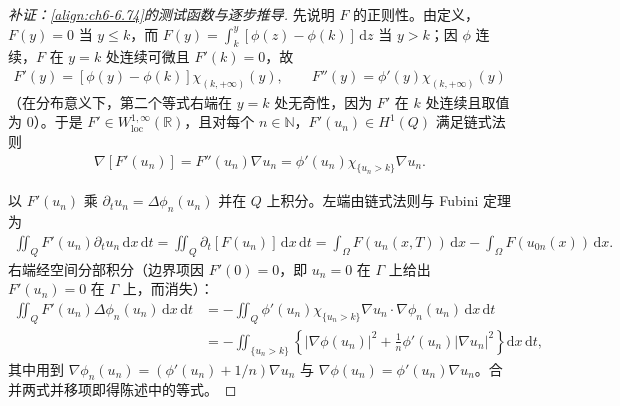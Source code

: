 \documentclass[../../main.tex]{subfiles}%
\begin{document}
\begin{proof}[补证：\eqref{align:ch6-6.74}的测试函数与逐步推导]
先说明 $F$ 的正则性。由定义，$F(y)=0$ 当 $y\leqslant k$，而 $F(y)=\int_k^y[\phi(z)-\phi(k)]\,\mathrm{d}z$ 当 $y>k$；因 $\phi$ 连续，$F$ 在 $y=k$ 处连续可微且 $F'(k)=0$，故
\begin{align*}
F'(y)=[\phi(y)-\phi(k)]\chi_{(k,+\infty)}(y),\qquad
F''(y)=\phi'(y)\chi_{(k,+\infty)}(y)
\end{align*}
（在分布意义下，第二个等式右端在 $y=k$ 处无奇性，因为 $F'$ 在 $k$ 处连续且取值为 $0$）。于是 $F'\in W^{1,\infty}_{\mathrm{loc}}(\mathbb{R})$，且对每个 $n\in\mathbb{N}$，$F'(u_n)\in H^1(Q)$ 满足链式法则
\begin{align*}
\nabla[F'(u_n)]=F''(u_n)\nabla u_n=\phi'(u_n)\chi_{\{u_n>k\}}\nabla u_n .
\end{align*}

以 $F'(u_n)$ 乘 $\partial_tu_n=\Delta\phi_n(u_n)$ 并在 $Q$ 上积分。左端由链式法则与 Fubini 定理为
\begin{align*}
\iint_QF'(u_n)\partial_tu_n\,\mathrm{d}x\,\mathrm{d}t
=\iint_Q\partial_t[F(u_n)]\,\mathrm{d}x\,\mathrm{d}t
=\int_\Omega F(u_n(x,T))\,\mathrm{d}x-\int_\Omega F(u_{0n}(x))\,\mathrm{d}x .
\end{align*}
右端经空间分部积分（边界项因 $F'(0)=0$，即 $u_n=0$ 在 $\Gamma$ 上给出 $F'(u_n)=0$ 在 $\Gamma$ 上，而消失）：
\begin{align*}
\iint_QF'(u_n)\Delta\phi_n(u_n)\,\mathrm{d}x\,\mathrm{d}t
&=-\iint_Q\phi'(u_n)\chi_{\{u_n>k\}}\nabla u_n\cdot\nabla\phi_n(u_n)\,\mathrm{d}x\,\mathrm{d}t\\
&=-\iint_{\{u_n>k\}}\left\{|\nabla\phi(u_n)|^2+\frac{1}{n}\phi'(u_n)|\nabla u_n|^2\right\}\mathrm{d}x\,\mathrm{d}t,
\end{align*}
其中用到 $\nabla\phi_n(u_n)=(\phi'(u_n)+1/n)\nabla u_n$ 与 $\nabla\phi(u_n)=\phi'(u_n)\nabla u_n$。合并两式并移项即得陈述中的等式。


\end{proof}
\end{document}
